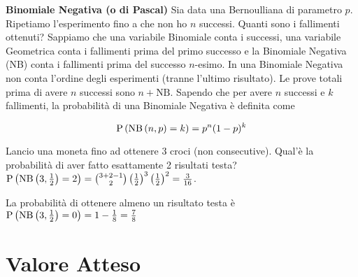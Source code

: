 \begin{defn}
    \textbf{Binomiale Negativa (o di Pascal)}
    Sia data una Bernoulliana di parametro $ p $. Ripetiamo l'esperimento fino a che non ho $ n $ successi. Quanti sono i fallimenti ottenuti? Sappiamo che una variabile Binomiale conta i successi, una variabile Geometrica conta i fallimenti prima del primo successo e la Binomiale Negativa (NB) conta i fallimenti prima del successo $ n $-esimo. In una Binomiale Negativa non conta l'ordine degli esperimenti (tranne l'ultimo risultato). Le prove totali prima di avere $ n $ successi sono $ n+\text{NB} $. Sapendo che per avere $ n $ successi e $ k $ fallimenti, la probabilità di una Binomiale Negativa è definita come 
    
    \begin{equation*}
    \text{P}\left(\text{NB}\left(n, p\right) = k\right) = p^n(1-p)^k
    \end{equation*}
\end{defn}

\begin{exmp}
    Lancio una moneta fino ad ottenere 3 croci (non consecutive). Qual'è la probabilità di aver fatto esattamente 2 risultati testa? $ \text{P}\left(\text{NB}\left(3, \frac{1}{2}\right) = 2\right) = \binom{3+2-1}{2} \left(\frac{1}{2}\right)^3 \left(\frac{1}{2}\right)^2 = \frac{3}{16} $. 
    
    La probabilità di ottenere almeno un risultato testa è $ \text{P}\left(\text{NB}\left(3, \frac{1}{2}\right) = 0\right) = 1 - \frac{1}{8} = \frac{7}{8} $
\end{exmp} 

\section{Valore Atteso}

